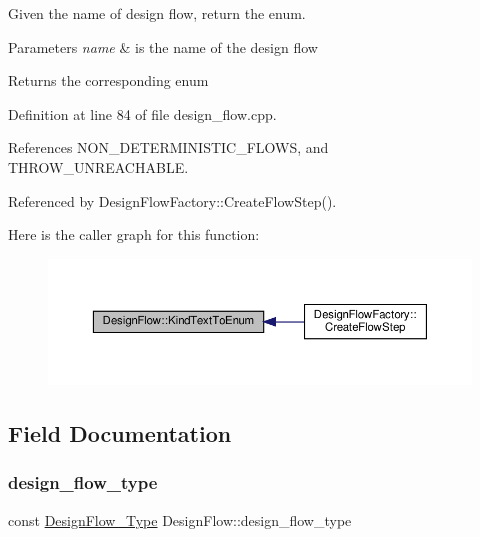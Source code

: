 Given the name of design flow, return the enum. 


\begin{DoxyParams}{Parameters}
{\em name} & is the name of the design flow \\
\hline
\end{DoxyParams}
\begin{DoxyReturn}{Returns}
the corresponding enum 
\end{DoxyReturn}


Definition at line 84 of file design\+\_\+flow.\+cpp.



References N\+O\+N\+\_\+\+D\+E\+T\+E\+R\+M\+I\+N\+I\+S\+T\+I\+C\+\_\+\+F\+L\+O\+WS, and T\+H\+R\+O\+W\+\_\+\+U\+N\+R\+E\+A\+C\+H\+A\+B\+LE.



Referenced by Design\+Flow\+Factory\+::\+Create\+Flow\+Step().

Here is the caller graph for this function\+:
\nopagebreak
\begin{figure}[H]
\begin{center}
\leavevmode
\includegraphics[width=350pt]{d2/d61/classDesignFlow_a489bafa0366d812deb15424b54d822c9_icgraph}
\end{center}
\end{figure}


\subsection{Field Documentation}
\mbox{\label{classDesignFlow_a5774fa7fbbd7935123f6705578fe50b0}} 
\subsubsection{\texorpdfstring{design\+\_\+flow\+\_\+type}{design\_flow\_type}}
{\footnotesize\ttfamily const \hyperlink{design__flow_8hpp_a0701ad2cbf08dc97b38caee3bbbff0c0}{Design\+Flow\+\_\+\+Type} Design\+Flow\+::design\+\_\+flow\+\_\+type\hspace{0.3cm}{\ttfamily [protected]}}



